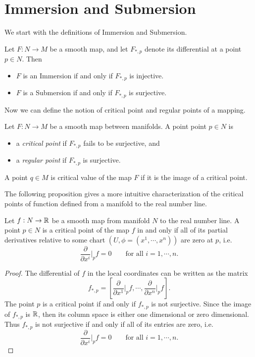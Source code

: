 \section{Immersion and Submersion}
We start with the definitions of Immersion and Submersion.
\begin{definition}
	Let $ F:N\to M $ be a smooth map, and let $ F_{*,p} $ denote its differential at a point $ p \in N $. Then 
	\begin{itemize}[noitemsep]
		\item $ F $ is an Immersion if and only if $ F_{*,p} $ is injective.
		\item $ F $ is a Submersion if and only if $ F_{*,p} $ is surjective.
	\end{itemize}
\end{definition}

Now we can define the notion of critical point and regular points of a mapping.
\begin{definition}
	Let $ F:N \to M $ be a smooth map between manifolds. A point point $ p  \in N$ is
	\begin{itemize}[noitemsep]
		\item a \emph{critical point} if $ F_{*,p} $ fails to be surjective, and
		\item a \emph{regular point} if $ F_{*,p} $ is surjective.
	\end{itemize}
	A point $ q \in M $ is critical value of the map $ F $ if it is the image of a critical point.
\end{definition}

The following proposition gives a more intuitive characterization of the critical points of function defined from a manifold to the real number line.

\begin{proposition}
	\label{prop:CriticalPointOfARealMap}
	Let $ f: N \to \mathbb{R} $ be a smooth map from manifold $ N $ to the real number line. A point $ p \in N $ is a critical point of the map $ f $ in and only if all of its partial derivatives relative to some chart $ (U,\phi=(x^1,\cdots,x^n)) $ are zero at $ p $, i.e.
	\[ \frac{\partial }{\partial x^i}\big|_{p} f = 0 \qquad \text{for all } i = 1,\cdots, n. \]
\end{proposition}
\begin{proof}
	The differential of $ f $ in the local coordinates can be written as the matrix
	\[ f_{*,p} = [ \frac{\partial}{\partial  x^1}\big|_{p} f, \cdots, \frac{\partial}{\partial  x^n}\big|_{p} f ]. \]
	The point $ p $ is a critical point if and only if $ f_{*,p} $ is not surjective. Since the image of $ f_{*,p} $ is $ \mathbb{R} $, then its column space is either one dimensional or zero dimensional. Thus $ f_{*,p} $ is not surjective if and only if all of its entries are zero, i.e.
	\[ \frac{\partial }{\partial x^i}\big|_{p} f = 0 \qquad \text{for all } i = 1,\cdots, n. \]
\end{proof}

